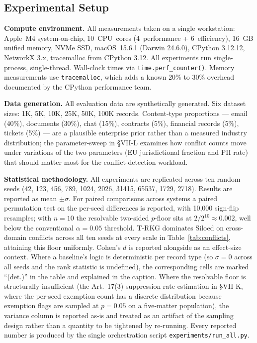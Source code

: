 \documentclass{ieeeaccess}
\begin{document}
\subsection{Experimental Setup}

\textbf{Compute environment.} All measurements taken on a single workstation: Apple~M4 system-on-chip, 10~CPU~cores (4~performance + 6~efficiency), 16~GB unified memory, NVMe SSD, macOS~15.6.1 (Darwin 24.6.0), CPython 3.12.12, NetworkX 3.x, tracemalloc from CPython 3.12. All experiments run single-process, single-thread. Wall-clock times via \texttt{time.perf\_counter()}. Memory measurements use \texttt{tracemalloc}, which adds a known 20\% to 30\% overhead documented by the CPython performance team.

\textbf{Data generation.} All evaluation data are synthetically generated. Six dataset sizes: 1K, 5K, 10K, 25K, 50K, 100K records. Content-type proportions — email (40\%), documents (30\%), chat (15\%), contracts (5\%), financial records (5\%), tickets (5\%) — are a plausible enterprise prior rather than a measured industry distribution; the parameter-sweep in §VII-L examines how conflict counts move under variations of the two parameters (EU jurisdictional fraction and PII rate) that should matter most for the conflict-detection workload.

\textbf{Statistical methodology.} All experiments are replicated across ten random seeds (42, 123, 456, 789, 1024, 2026, 31415, 65537, 1729, 2718). Results are reported as mean $\pm \sigma$. For paired comparisons across systems a paired permutation test on the per-seed differences is reported, with 10{,}000 sign-flip resamples; with $n{=}10$ the resolvable two-sided $p$-floor sits at $2/2^{10} \approx 0.002$, well below the conventional $\alpha=0.05$ threshold. T-RKG dominates Siloed on cross-domain conflicts across all ten seeds at every scale in Table~\ref{tab:conflicts}, attaining this floor uniformly. Cohen's $d$ is reported alongside as an effect-size context. Where a baseline's logic is deterministic per record type (so $\sigma=0$ across all seeds and the rank statistic is undefined), the corresponding cells are marked ``(det.)'' in the table and explained in the caption. Where the resolvable floor is structurally insufficient (the Art.~17(3) suppression-rate estimation in §VII-K, where the per-seed exemption count has a discrete distribution because exemption flags are sampled at $p{=}0.05$ on a five-matter population), the variance column is reported as-is and treated as an artifact of the sampling design rather than a quantity to be tightened by re-running. Every reported number is produced by the single orchestration script \texttt{experiments/run\_all.py}.
\end{document}
